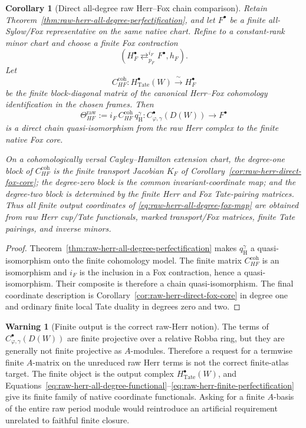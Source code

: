 \documentclass[11pt]{article}
\newtheorem{corollary}[theorem]{Corollary}
\theoremstyle{definition}
\newtheorem{warning}[theorem]{Warning}
\begin{document}
\begin{corollary}[Direct all-degree raw Herr--Fox chain comparison]\label{cor:raw-herr-all-degree-fox}
Retain Theorem~\ref{thm:raw-herr-all-degree-perfectification}, and let $F^\bullet$ be a finite all-Sylow/Fox representative on the same native chart.  Refine to a constant-rank minor chart and choose a finite Fox contraction
\[
 \left(
 H_F^\bullet
 \mathop{\rightleftarrows}^{i_F}_{p_F}
 F^\bullet,h_F
 \right).
\]
Let
\[
 C_{HF}^{\mathrm{coh}}:
 H^\bullet_{\mathrm{Tate}}(W)
 \xrightarrow{\ \sim\ }
 H_F^\bullet
\]
be the finite block-diagonal matrix of the canonical Herr--Fox cohomology identification in the chosen frames.  Then
\begin{equation}\label{eq:raw-herr-all-degree-fox-map}
 \boxed{
 \Theta_{HF}^{\mathrm{raw}}
 :=i_F\,C_{HF}^{\mathrm{coh}}\,q_{\mathrm H}^{\gamma}:
 C^\bullet_{\varphi,\gamma}(D(W))
 \longrightarrow F^\bullet
 }
\end{equation}
is a direct chain quasi-isomorphism from the raw Herr complex to the finite native Fox core.

On a cohomologically versal Cayley--Hamilton extension chart, the degree-one block of $C_{HF}^{\mathrm{coh}}$ is the finite transport Jacobian $K_F$ of Corollary~\ref{cor:raw-herr-direct-fox-core}; the degree-zero block is the common invariant-coordinate map; and the degree-two block is determined by the finite Herr and Fox Tate-pairing matrices.  Thus all finite output coordinates of \eqref{eq:raw-herr-all-degree-fox-map} are obtained from raw Herr cup/Tate functionals, marked transport/Fox matrices, finite Tate pairings, and inverse minors.
\end{corollary}

\begin{proof}
Theorem~\ref{thm:raw-herr-all-degree-perfectification} makes $q_{\mathrm H}^{\gamma}$ a quasi-isomorphism onto the finite cohomology model.  The finite matrix $C_{HF}^{\mathrm{coh}}$ is an isomorphism and $i_F$ is the inclusion in a Fox contraction, hence a quasi-isomorphism.  Their composite is therefore a chain quasi-isomorphism.  The final coordinate description is Corollary~\ref{cor:raw-herr-direct-fox-core} in degree one and ordinary finite local Tate duality in degrees zero and two.
\end{proof}

\begin{warning}[Finite output is the correct raw-Herr notion]\label{warn:raw-herr-not-finite-a-matrix}
The terms of $C^\bullet_{\varphi,\gamma}(D(W))$ are finite projective over a relative Robba ring, but they are generally not finite projective as $A$-modules.  Therefore a request for a termwise finite $A$-matrix on the unreduced raw Herr terms is not the correct finite-atlas target.  The finite object is the output complex $H^\bullet_{\mathrm{Tate}}(W)$, and Equations~\eqref{eq:raw-herr-all-degree-functional}--\eqref{eq:raw-herr-finite-perfectification} give its finite family of native coordinate functionals.  Asking for a finite $A$-basis of the entire raw period module would reintroduce an artificial requirement unrelated to faithful finite closure.
\end{warning}
\end{document}
